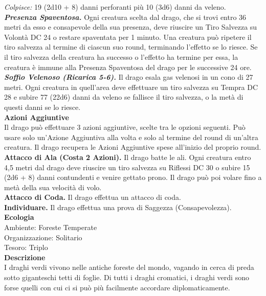 \begin{multicols}{2}
\emph{Colpisce:} 19 (2d10 + 8) danni perforanti più 10 (3d6) danni da veleno.\\
\emph{\textbf{Presenza Spaventosa.}} Ogni creatura scelta dal drago, che si trovi entro 36 metri da esso e consapevole della sua presenza, deve riuscire un Tiro Salvezza su Volontà DC  24 o restare spaventata per 1 minuto. Una creatura può ripetere il tiro salvezza al termine di ciascun suo round, terminando l'effetto se lo riesce. Se il tiro salvezza della creatura ha successo o l'effetto ha termine per essa, la creatura è immune alla Presenza Spaventosa del drago per le successive 24 ore.\\
\emph{\textbf{Soffio Velenoso (Ricarica 5-6).}} Il drago esala gas velenosi in un cono di 27 metri. Ogni creatura in quell'area deve effettuare un tiro salvezza su Tempra DC  28 e subire 77 (22d6) danni da veleno se fallisce il tiro salvezza, o la metà di questi danni se lo riesce.\\
\textbf{Azioni Aggiuntive}\\
Il drago può effettuare 3 azioni aggiuntive, scelte tra le opzioni seguenti. Può usare solo un'Azione Aggiuntiva alla volta e solo al termine del round di un'altra creatura. Il drago recupera le Azioni Aggiuntive spese all'inizio del proprio round.\\
\textbf{Attacco di Ala (Costa 2 Azioni).} Il drago batte le ali. Ogni creatura entro 4,5 metri dal  drago deve riuscire un tiro salvezza su Riflessi DC  30 o subire 15 (2d6 + 8) danni contundenti e venire gettato prono. Il drago può poi volare fino a metà della sua velocità di volo. \\
\textbf{Attacco di Coda.} Il drago effettua un attacco di coda.\\
\textbf{Individuare.} Il drago effettua una prova di Saggezza (Consapevolezza).\\
\textbf{Ecologia}\\
Ambiente: Foreste Temperate\\
Organizzazione: Solitario\\
Tesoro: Triplo\\
\textbf{Descrizione}\\
I draghi verdi vivono nelle antiche foreste del mondo, vagando in cerca di preda sotto giganteschi tetti di foglie. Di tutti i draghi cromatici, i draghi verdi sono forse quelli con cui ci si può più facilmente accordare diplomaticamente.\\


\end{multicols}
